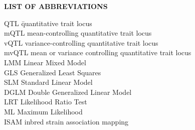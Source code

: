 {}

\begin{center}
{\Large \textbf{LIST OF ABBREVIATIONS}}
\end{center}

\newcommand{\Ab}[2]{\noindent  #1 \> #2 \\}
\newcommand{\Abi}[2]{\noindent #1 \hspace{1.5cm} \= #2 \\}

\begin{tabbing}
\Abi{QTL}{quantitative trait locus}
\Ab{mQTL}{mean-controlling quantitative trait locus}
\Ab{vQTL}{variance-controlling quantitative trait locus}
\Ab{mvQTL}{mean or variance controlling quantitative trait locus}
\Ab{LMM}{Linear Mixed Model}
\Ab{GLS}{Generalized Least Squares}
\Ab{SLM}{Standard Linear Model}
\Ab{DGLM}{Double Generalized Linear Model}
\Ab{LRT}{Likelihood Ratio Test}
\Ab{ML}{Maximum Likelihood}
\Ab{ISAM}{inbred strain association mapping}
\end{tabbing}

\clearpage
